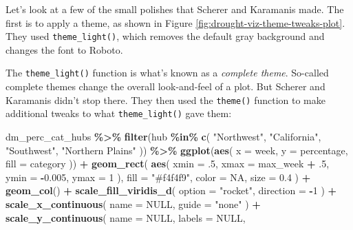\documentclass[
]{book}
\newenvironment{Shaded}{\begin{snugshade}}{\end{snugshade}}
\newcommand{\AttributeTok}[1]{\textcolor[rgb]{0.13,0.29,0.53}{#1}}
\newcommand{\ConstantTok}[1]{\textcolor[rgb]{0.56,0.35,0.01}{#1}}
\newcommand{\DecValTok}[1]{\textcolor[rgb]{0.00,0.00,0.81}{#1}}
\newcommand{\FloatTok}[1]{\textcolor[rgb]{0.00,0.00,0.81}{#1}}
\newcommand{\FunctionTok}[1]{\textcolor[rgb]{0.13,0.29,0.53}{\textbf{#1}}}
\newcommand{\NormalTok}[1]{#1}
\newcommand{\SpecialCharTok}[1]{\textcolor[rgb]{0.81,0.36,0.00}{\textbf{#1}}}
\newcommand{\StringTok}[1]{\textcolor[rgb]{0.31,0.60,0.02}{#1}}
\begin{document}
Let's look at a few of the small polishes that Scherer and Karamanis made. The first is to apply a theme, as shown in Figure \ref{fig:drought-viz-theme-tweaks-plot}. They used \texttt{theme\_light()}, which removes the default gray background and changes the font to Roboto.

The \texttt{theme\_light()} function is what's known as a \emph{complete theme}. So-called complete themes change the overall look-and-feel of a plot. But Scherer and Karamanis didn't stop there. They then used the \texttt{theme()} function to make additional tweaks to what \texttt{theme\_light()} gave them:

\begin{Shaded}
\begin{Highlighting}[]
\NormalTok{dm\_perc\_cat\_hubs }\SpecialCharTok{\%\textgreater{}\%}
  \FunctionTok{filter}\NormalTok{(hub }\SpecialCharTok{\%in\%} \FunctionTok{c}\NormalTok{(}
    \StringTok{"Northwest"}\NormalTok{,}
    \StringTok{"California"}\NormalTok{,}
    \StringTok{"Southwest"}\NormalTok{,}
    \StringTok{"Northern Plains"}
\NormalTok{  )) }\SpecialCharTok{\%\textgreater{}\%}
  \FunctionTok{ggplot}\NormalTok{(}\FunctionTok{aes}\NormalTok{(}
    \AttributeTok{x =}\NormalTok{ week,}
    \AttributeTok{y =}\NormalTok{ percentage,}
    \AttributeTok{fill =}\NormalTok{ category}
\NormalTok{  )) }\SpecialCharTok{+}
  \FunctionTok{geom\_rect}\NormalTok{(}
    \FunctionTok{aes}\NormalTok{(}
      \AttributeTok{xmin =}\NormalTok{ .}\DecValTok{5}\NormalTok{,}
      \AttributeTok{xmax =}\NormalTok{ max\_week }\SpecialCharTok{+}\NormalTok{ .}\DecValTok{5}\NormalTok{,}
      \AttributeTok{ymin =} \SpecialCharTok{{-}}\FloatTok{0.005}\NormalTok{,}
      \AttributeTok{ymax =} \DecValTok{1}
\NormalTok{    ),}
    \AttributeTok{fill =} \StringTok{"\#f4f4f9"}\NormalTok{,}
    \AttributeTok{color =} \ConstantTok{NA}\NormalTok{,}
    \AttributeTok{size =} \FloatTok{0.4}
\NormalTok{  ) }\SpecialCharTok{+}
  \FunctionTok{geom\_col}\NormalTok{() }\SpecialCharTok{+}
  \FunctionTok{scale\_fill\_viridis\_d}\NormalTok{(}
    \AttributeTok{option =} \StringTok{"rocket"}\NormalTok{,}
    \AttributeTok{direction =} \SpecialCharTok{{-}}\DecValTok{1}
\NormalTok{  ) }\SpecialCharTok{+}
  \FunctionTok{scale\_x\_continuous}\NormalTok{(}
    \AttributeTok{name =} \ConstantTok{NULL}\NormalTok{,}
    \AttributeTok{guide =} \StringTok{"none"}
\NormalTok{  ) }\SpecialCharTok{+}
  \FunctionTok{scale\_y\_continuous}\NormalTok{(}
    \AttributeTok{name =} \ConstantTok{NULL}\NormalTok{,}
    \AttributeTok{labels =} \ConstantTok{NULL}\NormalTok{,}

\end{Highlighting}
\end{Shaded}
\end{document}
